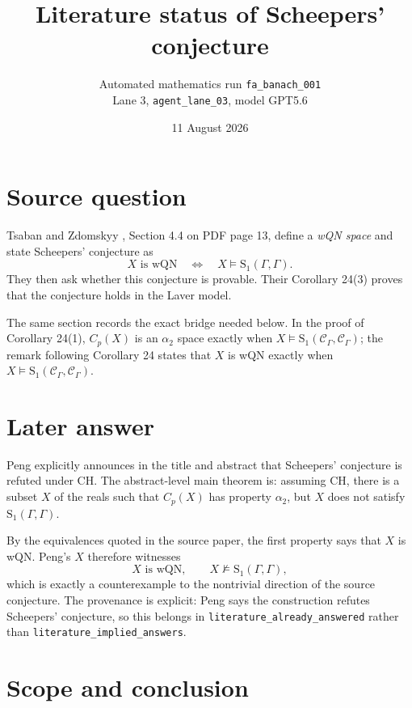 \documentclass[10pt]{article}
\title{Literature status of Scheepers' conjecture}
\author{Automated mathematics run \texttt{fa\_banach\_001}\\
Lane 3, \texttt{agent\_lane\_03}, model GPT5.6}
\date{11 August 2026}
\newcommand{\Sone}{\mathrm{S}_1}
\newcommand{\CG}{\mathcal C_{\Gamma}}
\begin{document}
\maketitle

\begin{center}
\end{center}

\section*{Source question}

Tsaban and Zdomskyy \cite{TZ2012}, Section 4.4 on PDF page 13, define a
\emph{wQN space} and state Scheepers' conjecture as
\[
 X\text{ is wQN}\quad\Longleftrightarrow\quad
 X\models \Sone(\Gamma,\Gamma).
\]
They then ask whether this conjecture is provable. Their Corollary 24(3) proves
that the conjecture holds in the Laver model.

The same section records the exact bridge needed below. In the proof of
Corollary 24(1), $C_p(X)$ is an $\alpha_2$ space exactly when
$X\models\Sone(\CG,\CG)$; the remark following Corollary 24 states that $X$ is
wQN exactly when $X\models\Sone(\CG,\CG)$.

\section*{Later answer}

Peng \cite{Peng2023} explicitly announces in the title and abstract that
Scheepers' conjecture is refuted under CH. The abstract-level main theorem is:
assuming CH, there is a subset $X$ of the reals such that $C_p(X)$ has
property $\alpha_2$, but $X$ does not satisfy $\Sone(\Gamma,\Gamma)$.

By the equivalences quoted in the source paper, the first property says that
$X$ is wQN. Peng's $X$ therefore witnesses
\[
 X\text{ is wQN},\qquad X\not\models\Sone(\Gamma,\Gamma),
\]
which is exactly a counterexample to the nontrivial direction of the source
conjecture. The provenance is explicit: Peng says the construction refutes
Scheepers' conjecture, so this belongs in \texttt{literature\_already\_answered}
rather than \texttt{literature\_implied\_answers}.

\section*{Scope and conclusion}
\end{document}
